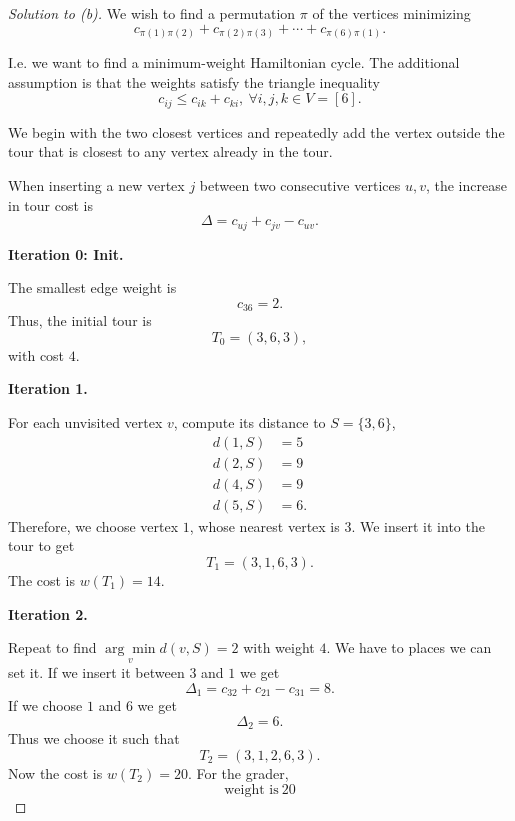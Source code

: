 \documentclass[11pt]{article}
\begin{document}
\begin{proof}[Solution to (b)]
    We wish to find a permutation $\pi$ of the 
    vertices minimizing 
    \[
        c_{\pi(1)\pi(2)} + 
        c_{\pi(2)\pi(3)} + \cdots + 
        c_{\pi(6)\pi(1)}. 
    \]

    I.e. we want to find 
    a minimum-weight Hamiltonian cycle. 
    The additional assumption is that the weights 
    satisfy the triangle inequality 
    \[
        c_{ij} \leq c_{ik} + c_{ki}, \ \forall i,j,k \in V = [6].
    \]

    We begin with the two closest vertices 
    and repeatedly add the vertex outside 
    the tour that is closest to any vertex 
    already in the tour. 

    When inserting a new vertex $j$ between 
    two consecutive vertices $u,v$, the increase in 
    tour cost is 
    \[
        \Delta = c_{uj} + c_{jv} - c_{uv}.
    \]

    \textbf{Iteration 0: Init.}

    The smallest edge weight is 
    \[
        c_{36} = 2. 
    \]
    Thus, the initial tour is 
    \[
        T_0 = (3,6,3), 
    \]
    with cost $4$. 

    \textbf{Iteration 1.}

    For each unvisited vertex $v$, compute 
    its distance to $S = \{3,6\}$, 
    \begin{align*}
        d(1,S) &= 5 \\ 
        d(2,S) &= 9 \\ 
        d(4,S) &= 9 \\ 
        d(5,S) &= 6. 
    \end{align*}
    Therefore, we choose vertex $1$, whose nearest 
    vertex is $3$. 
    We insert it into the tour to get 
    \[
        T_1 = (3,1,6,3). 
    \] 
    The cost is $w(T_1) = 14$. 

    \textbf{Iteration 2.}

    Repeat to find $\underset{v}{\arg\min} d(v,S) = 2$ with 
    weight $4$. 
    We have to places we can set it. 
    If we insert it between $3$ and $1$ we get 
    \[
        \Delta_1 = c_{32} + c_{21} - c_{31} 
        = 8. 
    \]
    If we choose $1$ and $6$ we get 
    \[
        \Delta_2 = 6. 
    \]
    Thus we choose it such that 
    \[
        T_2 = (3,1,2,6,3).
    \]
    Now the cost is $w(T_2) = 20$. 
    For the grader, 
    \[
        \text{weight is} \ \boxed{20}
    \]
\end{proof}
\end{document}
